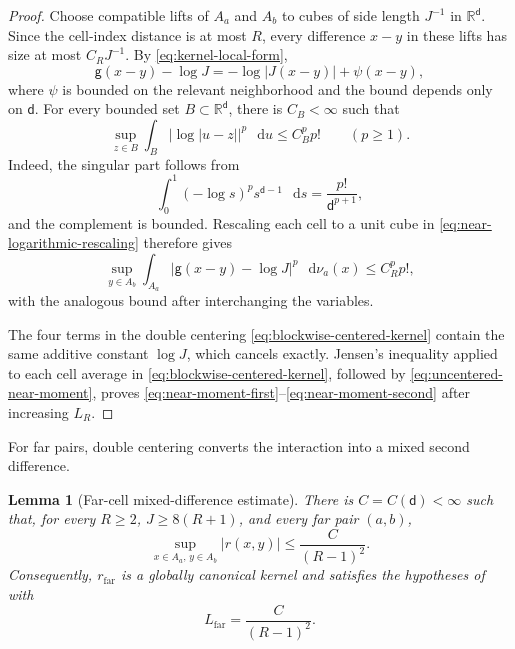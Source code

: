 \documentclass[11pt,reqno]{amsart}
\numberwithin{equation}{section}
\theoremstyle{plain}
\newtheorem{lemma}[lemma]{Lemma}
\theoremstyle{definition}
\renewcommand{\d}{\mathsf d}
\newcommand{\dd}{\mathop{}\!\mathrm d}
\newcommand{\R}{\mathbb R}
\newcommand{\g}{\mathsf g}
\begin{document}
\begin{proof}
Choose compatible lifts of $A_a$ and $A_b$ to cubes of side length $J^{-1}$ in $\R^{\d}$.  Since the cell-index distance is at most $R$, every difference $x-y$ in these lifts has size at most $C_RJ^{-1}$.  By \eqref{eq:kernel-local-form},
\begin{equation}
 \g(x-y)-\log J
 =-\log|J(x-y)|+\psi(x-y),
 \label{eq:near-logarithmic-rescaling}
\end{equation}
where $\psi$ is bounded on the relevant neighborhood and the bound depends only on $\d$.  For every bounded set $B\subset\R^{\d}$, there is $C_B<\infty$ such that
\begin{equation}
 \sup_{z\in B}\int_B|\log|u-z||^p\,\dd u
 \leq C_B^p p!
 \qquad(p\geq1).
 \label{eq:logarithmic-factorial-moment}
\end{equation}
Indeed, the singular part follows from
\begin{equation}
 \int_0^1(-\log s)^p s^{\d-1}\,\dd s
 =\frac{p!}{\d^{p+1}},
 \label{eq:radial-logarithmic-moment}
\end{equation}
and the complement is bounded.  Rescaling each cell to a unit cube in \eqref{eq:near-logarithmic-rescaling} therefore gives
\begin{equation}
 \sup_{y\in A_b}\int_{A_a}
 |\g(x-y)-\log J|^p\,\dd\nu_a(x)
 \leq C_R^p p!,
 \label{eq:uncentered-near-moment}
\end{equation}
with the analogous bound after interchanging the variables.

The four terms in the double centering \eqref{eq:blockwise-centered-kernel} contain the same additive constant $\log J$, which cancels exactly.  Jensen's inequality applied to each cell average in \eqref{eq:blockwise-centered-kernel}, followed by \eqref{eq:uncentered-near-moment}, proves \eqref{eq:near-moment-first}--\eqref{eq:near-moment-second} after increasing $L_R$.
\end{proof}

For far pairs, double centering converts the interaction into a mixed second difference.

\begin{lemma}[Far-cell mixed-difference estimate]
\label{lem:far-cell-mixed-difference}
There is $C=C(\d)<\infty$ such that, for every $R\geq2$, $J\geq8(R+1)$, and every far pair $(a,b)$,
\begin{equation}
 \sup_{x\in A_a,\,y\in A_b}|r(x,y)|
 \leq\frac{C}{(R-1)^2}.
 \label{eq:far-cell-bound}
\end{equation}
Consequently, $r_{\mathrm{far}}$ is a globally canonical kernel and satisfies the hypotheses of  with
\begin{equation}
 L_{\mathrm{far}}=\frac{C}{(R-1)^2}.
 \label{eq:far-moment-constant}
\end{equation}
\end{lemma}
\end{document}
